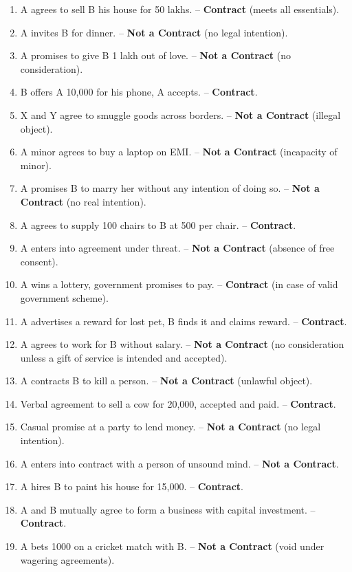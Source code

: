 \documentclass[12pt,a4paper]{book}
\begin{document}
\begin{enumerate}
    \item A agrees to sell B his house for 50 lakhs. – \textbf{Contract} (meets all essentials).
    \item A invites B for dinner. – \textbf{Not a Contract} (no legal intention).
    \item A promises to give B 1 lakh out of love. – \textbf{Not a Contract} (no consideration).
    \item B offers A 10,000 for his phone, A accepts. – \textbf{Contract}.
    \item X and Y agree to smuggle goods across borders. – \textbf{Not a Contract} (illegal object).
    \item A minor agrees to buy a laptop on EMI. – \textbf{Not a Contract} (incapacity of minor).
    \item A promises B to marry her without any intention of doing so. – \textbf{Not a Contract} (no real intention).
    \item A agrees to supply 100 chairs to B at 500 per chair. – \textbf{Contract}.
    \item A enters into agreement under threat. – \textbf{Not a Contract} (absence of free consent).
    \item A wins a lottery, government promises to pay. – \textbf{Contract} (in case of valid government scheme).
    \item A advertises a reward for lost pet, B finds it and claims reward. – \textbf{Contract}.
    \item A agrees to work for B without salary. – \textbf{Not a Contract} (no consideration unless a gift of service is intended and accepted).
    \item A contracts B to kill a person. – \textbf{Not a Contract} (unlawful object).
    \item Verbal agreement to sell a cow for 20,000, accepted and paid. – \textbf{Contract}.
    \item Casual promise at a party to lend money. – \textbf{Not a Contract} (no legal intention).
    \item A enters into contract with a person of unsound mind. – \textbf{Not a Contract}.
    \item A hires B to paint his house for 15,000. – \textbf{Contract}.
    \item A and B mutually agree to form a business with capital investment. – \textbf{Contract}.
    \item A bets 1000 on a cricket match with B. – \textbf{Not a Contract} (void under wagering agreements).

\end{enumerate}
\end{document}
